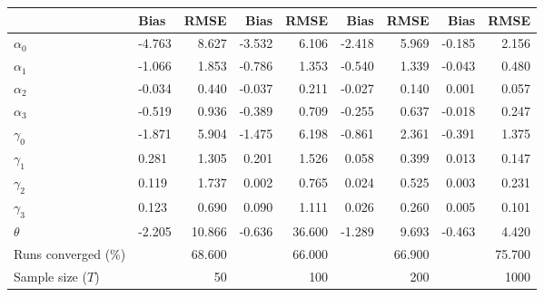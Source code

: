 
\begin{tabular}[t]{llrrrrrrr}
\toprule
  & Bias & RMSE & Bias & RMSE & Bias & RMSE & Bias & RMSE\\
\midrule
$\alpha_{0}$ & -4.763 & 8.627 & -3.532 & 6.106 & -2.418 & 5.969 & -0.185 & 2.156\\
$\alpha_{1}$ & -1.066 & 1.853 & -0.786 & 1.353 & -0.540 & 1.339 & -0.043 & 0.480\\
$\alpha_{2}$ & -0.034 & 0.440 & -0.037 & 0.211 & -0.027 & 0.140 & 0.001 & 0.057\\
$\alpha_{3}$ & -0.519 & 0.936 & -0.389 & 0.709 & -0.255 & 0.637 & -0.018 & 0.247\\
$\gamma_{0}$ & -1.871 & 5.904 & -1.475 & 6.198 & -0.861 & 2.361 & -0.391 & 1.375\\
$\gamma_{1}$ & 0.281 & 1.305 & 0.201 & 1.526 & 0.058 & 0.399 & 0.013 & 0.147\\
$\gamma_{2}$ & 0.119 & 1.737 & 0.002 & 0.765 & 0.024 & 0.525 & 0.003 & 0.231\\
$\gamma_{3}$ & 0.123 & 0.690 & 0.090 & 1.111 & 0.026 & 0.260 & 0.005 & 0.101\\
$\theta$ & -2.205 & 10.866 & -0.636 & 36.600 & -1.289 & 9.693 & -0.463 & 4.420\\
Runs converged (\%) &  & 68.600 &  & 66.000 &  & 66.900 &  & 75.700\\
Sample size ($T$) &  & 50 &  & 100 &  & 200 &  & 1000\\
\bottomrule
\end{tabular}
